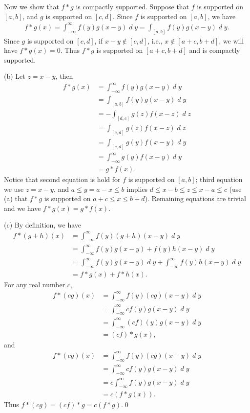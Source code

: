 \documentclass{book}
\DeclareMathOperator{\dd}{\mathit{d}}%
\begin{document}
Now we show that $f*g$ is compactly supported. Suppose that $f$ is supported on $[a, b]$, and $g$ is supported on $[c, d]$. Since $f$ is supported on $[a, b]$, we have
    \begin{align*}
        f*g(x)
        = \int_{-\infty}^{\infty} f(y)g(x - y) \dd y
        = \int_{[a, b]} f(y)g(x - y) \dd y.
    \end{align*}
Since $g$ is supported on $[c, d]$, if $x - y \notin [c, d]$, i.e., $x \notin [a + c, b + d]$, we will have $f*g(x) = 0$. Thus $f*g$ is supported on $[a + c, b + d]$ and is compactly supported.

(b) Let $z = x - y$, then
    \begin{align*}
        f*g(x)
        &= \int_{-\infty}^{\infty} f(y)g(x - y) \dd y\\
        &= \int_{[a, b]} f(y)g(x - y) \dd y\\
        &= -\int_{[d, c]} g(z)f(x - z) \dd z\\
        &= \int_{[c, d]} g(z)f(x - z) \dd z\\
        &= \int_{[c, d]} g(y)f(x - y) \dd y\\
        &= \int_{-\infty}^{\infty} g(y)f(x - y) \dd y\\
        &= g*f(x).
    \end{align*}
Notice that second equation is hold for $f$ is supported on $[a, b]$; third equation we use $z = x - y$, and $a \leq y = a-x \leq b$ implies $d\leq x - b \leq z \leq x - a \leq c$ (use (a) that $f*g$ is supported on $a + c \leq x \leq b + d$). Remaining equations are trivial and we have $f*g(x) = g*f(x)$.

(c) By definition, we have
    \begin{align*}
        f*(g + h)(x)
        &= \int_{-\infty}^{\infty} f(y)(g + h)(x - y) \dd y\\
        &= \int_{-\infty}^{\infty} f(y)g(x - y) + f(y)h(x - y) \dd y\\
        &= \int_{-\infty}^{\infty} f(y)g(x - y) \dd y + \int_{-\infty}^{\infty} f(y)h(x - y) \dd y\\
        &= f*g(x) + f*h(x).
    \end{align*}
For any real number $c$,
    \begin{align*}
        f*(cg)(x)
        &= \int_{-\infty}^{\infty} f(y)(cg)(x - y) \dd y\\
        &= \int_{-\infty}^{\infty} cf(y)g(x - y) \dd y\\
        &= \int_{-\infty}^{\infty} (cf)(y)g(x - y) \dd y\\
        &= (cf)*g(x),
    \end{align*}
and
    \begin{align*}
        f*(cg)(x)
        &= \int_{-\infty}^{\infty} f(y)(cg)(x - y) \dd y\\
        &= \int_{-\infty}^{\infty} cf(y)g(x - y) \dd y\\
        &= c\int_{-\infty}^{\infty} f(y)g(x - y) \dd y\\
        &= c(f*g(x)).
    \end{align*}
Thus $f*(cg) = (cf)*g = c(f*g)$.\qed
\end{document}
